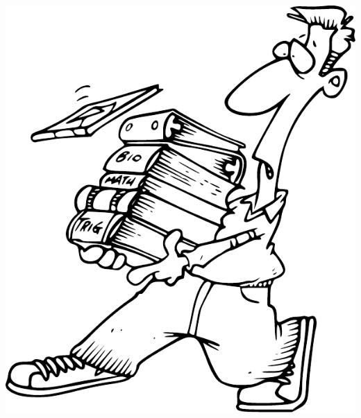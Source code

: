 \documentclass[11pt,english,twoside]{book}
\begin{document}






\cleardoublepage



\begin{center}
\includegraphics[width=0.4\columnwidth]{Figures/Bibliography}
\par\end{center}



\cleardoublepage

\printindex
\printindex[DL]
\printindex[PL]
\end{document}
